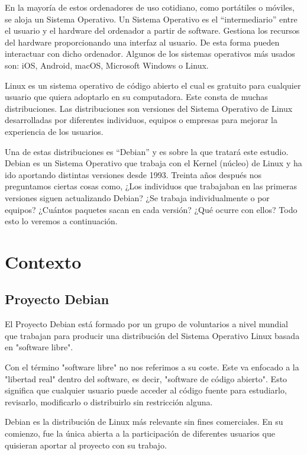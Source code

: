 \documentclass[a4paper, 12pt]{book}
\begin{document}
En la mayoría de estos ordenadores de uso cotidiano, como portátiles o móviles, se aloja un Sistema Operativo. Un Sistema Operativo es el “intermediario” entre el usuario y el hardware del ordenador a partir de software. Gestiona los recursos del hardware proporcionando una interfaz al usuario. De esta forma pueden interactuar con dicho ordenador. 
Algunos de los sistemas operativos más usados son: iOS, Android, macOS, Microsoft Windows o Linux. 

Linux es un sistema operativo de código abierto el cual es gratuito para cualquier usuario que quiera adoptarlo en su computadora. Este consta de muchas distribuciones. Las distribuciones son versiones del Sistema Operativo de Linux desarrolladas por diferentes individuos, equipos o empresas para mejorar la experiencia de los usuarios.

Una de estas distribuciones es “Debian” y es sobre la que tratará este estudio.
Debian es un Sistema Operativo que trabaja con el Kernel (núcleo) de Linux y ha ido aportando distintas versiones desde 1993. 
Treinta años después nos preguntamos ciertas cosas como, ¿Los individuos que trabajaban en las primeras versiones siguen actualizando Debian? ¿Se trabaja individualmente o por equipos? ¿Cuántos paquetes sacan en cada versión? ¿Qué ocurre con ellos? Todo esto lo veremos a continuación.



\section{Contexto}
\label{sec:contexto}



\subsection{Proyecto Debian}
\label{subsec:proyecto debian}

El Proyecto Debian está formado por un grupo de voluntarios a nivel mundial que trabajan para producir una distribución del Sistema Operativo Linux basada en "software libre".

Con el término "software libre" no nos referimos a su coste. Este va enfocado a la "libertad real" dentro del software, es decir, "software de código abierto".
Esto significa que cualquier usuario puede acceder al código fuente para estudiarlo, revisarlo, modificarlo o distribuirlo sin restricción alguna.

Debian es la distribución de Linux más relevante sin fines comerciales.
En su comienzo, fue la única abierta a la participación de diferentes usuarios que quisieran aportar al proyecto con su trabajo.
\end{document}
